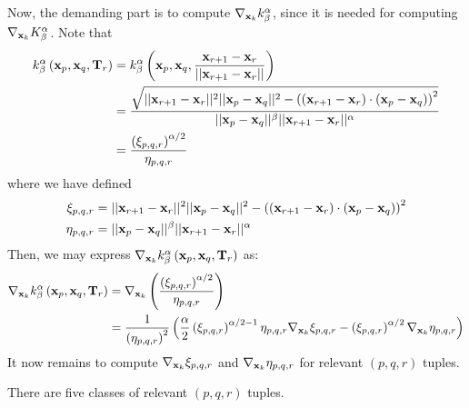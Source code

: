 \documentclass[../dissertation.tex]{subfiles}
\begin{document}
Now, the demanding part is to compute $\nabla_{\mathbf{x}_k} k_{\beta}^{\alpha}$, since it is needed for computing $\nabla_{\mathbf{x}_k} K_{\beta}^{\alpha}$.
Note that
\begin{align}
    k_{\beta}^{\alpha} \left( \mathbf{x}_p, \mathbf{x}_q, \mathbf{T}_r \right) &= k_{\beta}^{\alpha} \left( \mathbf{x}_p, \mathbf{x}_q, \frac{\mathbf{x}_{r+1} - \mathbf{x}_r}{\lvert \lvert \mathbf{x}_{r+1} - \mathbf{x}_r \rvert \rvert} \right) \nonumber \\
    &= \frac{\sqrt{\lvert \lvert \mathbf{x}_{r+1} - \mathbf{x}_r \rvert \rvert^2 \lvert \lvert \mathbf{x}_p - \mathbf{x}_q \rvert \rvert^2 - \left( \left( \mathbf{x}_{r+1} - \mathbf{x}_r \right) \cdot \left( \mathbf{x}_p - \mathbf{x}_q \right) \right)^2}}{\lvert \lvert \mathbf{x}_p - \mathbf{x}_q \rvert \rvert^{\beta} \lvert \lvert \mathbf{x}_{r+1} - \mathbf{x}_r \rvert \rvert^{\alpha}} \nonumber \\
    &= \frac{\left( \xi_{p,q,r} \right)^{\alpha/2}}{\eta_{p,q,r}}
    \label{equ: Exact Gradient 3}
\end{align}
where we have defined
\begin{align*}
    \xi_{p,q,r} &= \lvert \lvert \mathbf{x}_{r+1} - \mathbf{x}_r \rvert \rvert^2 \lvert \lvert \mathbf{x}_p - \mathbf{x}_q \rvert \rvert^2 - \left( \left( \mathbf{x}_{r+1} - \mathbf{x}_r \right) \cdot \left( \mathbf{x}_p - \mathbf{x}_q \right) \right)^2 \\
    \eta_{p,q,r} &= \lvert \lvert \mathbf{x}_p - \mathbf{x}_q \rvert \rvert^{\beta} \lvert \lvert \mathbf{x}_{r+1} - \mathbf{x}_r \rvert \rvert^{\alpha}
\end{align*}
Then, we may express $\nabla_{\mathbf{x}_k} k_{\beta}^{\alpha} \left( \mathbf{x}_p, \mathbf{x}_q, \mathbf{T}_r \right)$ as:
\begin{align}
    \nabla_{\mathbf{x}_k} k_{\beta}^{\alpha} \left( \mathbf{x}_p, \mathbf{x}_q, \mathbf{T}_r \right)
    &= \nabla_{\mathbf{x}_k} \left(\frac{\left( \xi_{p,q,r} \right)^{\alpha/2}}{\eta_{p,q,r}} \right) \nonumber \\
    &=
    \frac{1}{\left( \eta_{p,q,r} \right)^2} \left( \frac{\alpha}{2} \left( \xi_{p,q,r} \right)^{\alpha/2-1} \eta_{p,q,r} \nabla_{\mathbf{x}_k} \xi_{p,q,r} - \left( \xi_{p,q,r} \right)^{\alpha/2} \nabla_{\mathbf{x}_k} \eta_{p,q,r} \right)
    \label{equ: Exact Gradient 4}
\end{align}
It now remains to compute $\nabla_{\mathbf{x}_k} \xi_{p,q,r}$ and $\nabla_{\mathbf{x}_k} \eta_{p,q,r}$ for relevant $(p,q,r)$ tuples.

There are five classes of relevant $(p,q,r)$ tuples.
\end{document}
